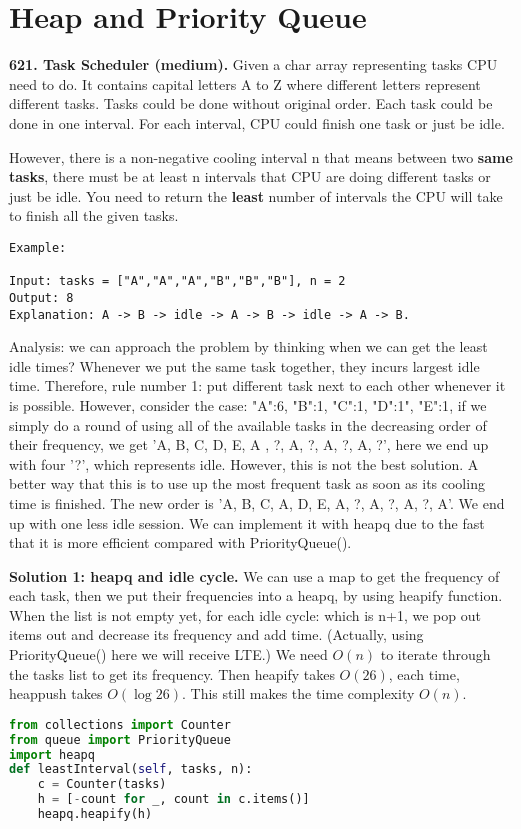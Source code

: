 \documentclass[../main.tex]{subfiles}
\begin{document}
\section{Heap and Priority Queue}
\begin{examples}[resume]
\item \textbf{621. Task Scheduler (medium).} Given a char array representing tasks CPU need to do. It contains capital letters A to Z where different letters represent different tasks. Tasks could be done without original order. Each task could be done in one interval. For each interval, CPU could finish one task or just be idle.

However, there is a non-negative cooling interval n that means between two \textbf{same tasks}, there must be at least n intervals that CPU are doing different tasks or just be idle. You need to return the \textbf{least} number of intervals the CPU will take to finish all the given tasks.
\begin{lstlisting}[numbers=none]
Example:

Input: tasks = ["A","A","A","B","B","B"], n = 2
Output: 8
Explanation: A -> B -> idle -> A -> B -> idle -> A -> B.
\end{lstlisting}

Analysis: we can approach the problem by thinking when we can get the least idle times? Whenever we put the same task together, they incurs largest idle time. Therefore, rule number 1: put different task next to each other whenever it is possible. However, consider the case: {"A":6, "B":1, "C":1, "D":1", "E":1}, if we simply do a round of using all of the available tasks in the decreasing order of their frequency, we get 'A, B, C, D, E, A , ?, A, ?, A, ?, A, ?', here we end up with four '?', which represents idle. However, this is not the best solution. A better way that this is to use up the most frequent task as soon as its cooling time is finished. The new order is 'A, B, C, A, D, E, A, ?, A, ?, A, ?, A'. We end up with one less idle session. We can implement it with heapq due to the fast that it is more efficient compared with PriorityQueue(). 

\textbf{Solution 1: heapq and idle cycle. } We can use a map to get the frequency of each task, then we put their frequencies into a heapq, by using heapify function. When the list is not empty yet, for each idle cycle: which is n+1, we pop out items out and decrease its frequency and add time. (Actually, using PriorityQueue() here we will receive LTE.) We need $O(n)$ to iterate through the tasks list to get its frequency. Then heapify takes $O(26)$, each time, heappush takes $O(\log 26)$. This still makes the time complexity $O(n)$. 
\begin{lstlisting}[language=Python]
from collections import Counter
from queue import PriorityQueue
import heapq
def leastInterval(self, tasks, n):
    c = Counter(tasks)
    h = [-count for _, count in c.items()]
    heapq.heapify(h)


\end{lstlisting}
\end{examples}
\end{document}
